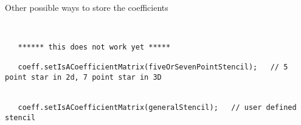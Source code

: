 Other possible ways to store the coefficients
{\footnotesize
\begin{verbatim}


   ****** this does not work yet *****

   coeff.setIsACoefficientMatrix(fiveOrSevenPointStencil);   // 5 point star in 2d, 7 point star in 3D
   
  
   coeff.setIsACoefficientMatrix(generalStencil);   // user defined stencil

\end{verbatim}
}